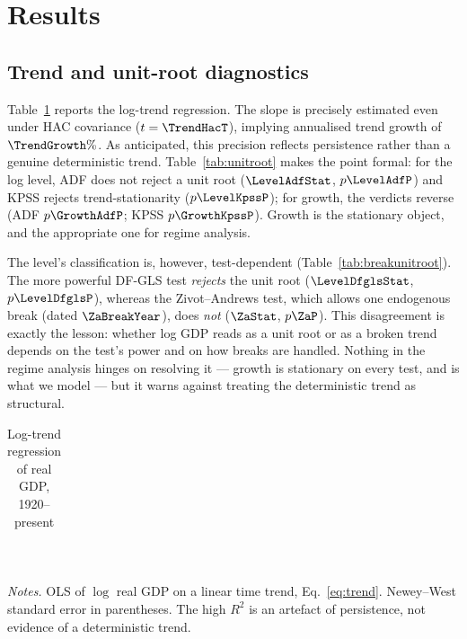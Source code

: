\documentclass[11pt]{article}
\begin{document}
\section{Results}
\label{sec:results}

\subsection{Trend and unit-root diagnostics}

Table~\ref{tab:trend} reports the log-trend regression. The slope is precisely
estimated even under HAC covariance ($t = \TrendHacT$), implying annualised trend
growth of $\TrendGrowth\%$. As anticipated, this precision reflects persistence
rather than a genuine deterministic trend. Table~\ref{tab:unitroot} makes the
point formal: for the log level, ADF does not reject a unit root
($\LevelAdfStat$, $p \LevelAdfP$) and KPSS rejects trend-stationarity
($p \LevelKpssP$); for growth, the verdicts reverse (ADF $p \GrowthAdfP$; KPSS
$p \GrowthKpssP$). Growth is the stationary object, and the appropriate one for
regime analysis.

The level's classification is, however, test-dependent
(Table~\ref{tab:breakunitroot}). The more powerful DF-GLS test \emph{rejects} the
unit root ($\LevelDfglsStat$, $p \LevelDfglsP$), whereas the Zivot--Andrews test,
which allows one endogenous break (dated $\ZaBreakYear$), does \emph{not}
($\ZaStat$, $p \ZaP$). This disagreement is exactly the \citet{perron1989}
lesson: whether log GDP reads as a unit root or as a broken trend depends on the
test's power and on how breaks are handled. Nothing in the regime analysis hinges
on resolving it --- growth is stationary on every test, and is what we model ---
but it warns against treating the deterministic trend as structural.

\begin{table}[H]
  \centering
  \caption{Log-trend regression of real GDP, 1920--present}
  \label{tab:trend}
  \begin{tabular}{lr}
    \toprule
    
  \end{tabular}
  \\[0.4em]
  {\footnotesize\begin{minipage}{0.86\linewidth}
  \textit{Notes.} OLS of $\log$ real GDP on a linear time trend,
  Eq.~\eqref{eq:trend}. Newey--West standard error in parentheses. The high $R^2$
  is an artefact of persistence, not evidence of a deterministic trend.
  \end{minipage}}
\end{table}
\end{document}
